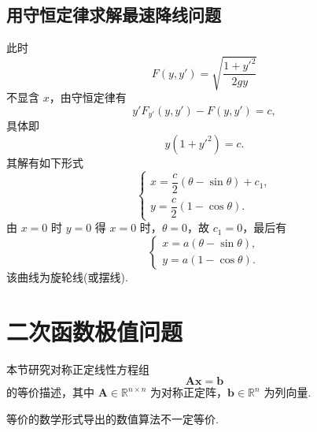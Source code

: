 \subsection{用守恒定律求解最速降线问题}

此时
\begin{equation*}
    F(y, y') = \sqrt{\frac{1+y'^2}{2gy}}
\end{equation*}
不显含 $x$，由守恒定律有
\begin{equation*}
    y' F_{y'} (y, y') - F(y, y') = c,
\end{equation*}
具体即
\begin{equation*}
    y(1+y'^2) = c.
\end{equation*}
其解有如下形式
\begin{equation*}
    \begin{cases} 
        x = \dfrac{c}{2} (\theta - \sin\theta) + c_1, \\[1ex]
        y = \dfrac{c}{2} (1 - \cos\theta). 
    \end{cases}
\end{equation*}
由 $x=0$ 时 $y=0$ 得 $x=0$ 时，$\theta=0$，故 $c_1=0$，最后有
\begin{equation*}
    \begin{cases} 
        x = a (\theta - \sin\theta), \\[1ex]
        y = a (1 - \cos\theta). 
    \end{cases}
\end{equation*}
该曲线为旋轮线(或摆线).

\section{二次函数极值问题}
本节研究对称正定线性方程组
\begin{equation}\label{eq:对称正定线性方程组}
    \bm{A}\bm{x} = \bm{b}
\end{equation}
的等价描述，其中 $\bm{A} \in \mathbb{R}^{n \times n}$ 为对称正定阵，$\bm{b} \in \mathbb{R}^n$ 为列向量.

\begin{note}[冯康原理]
等价的数学形式导出的数值算法不一定等价.
\end{note}

